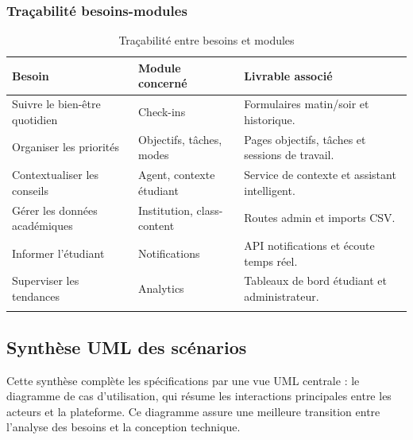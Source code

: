 \documentclass{rapportENSET}
\begin{document}
\subsubsection*{Traçabilité besoins-modules}
\begin{longtable}{@{}L{0.30\textwidth}L{0.30\textwidth}L{0.30\textwidth}@{}}
\toprule
\textbf{Besoin} & \textbf{Module concerné} & \textbf{Livrable associé} \\
\midrule
\endhead
Suivre le bien-être quotidien & Check-ins & Formulaires matin/soir et historique. \\
Organiser les priorités & Objectifs, tâches, modes & Pages objectifs, tâches et sessions de travail. \\
Contextualiser les conseils & Agent, contexte étudiant & Service de contexte et assistant intelligent. \\
Gérer les données académiques & Institution, class-content & Routes admin et imports CSV. \\
Informer l'étudiant & Notifications & API notifications et écoute temps réel. \\
Superviser les tendances & Analytics & Tableaux de bord étudiant et administrateur. \\
\bottomrule
\caption{Traçabilité entre besoins et modules}
\end{longtable}

\subsection{Synthèse UML des scénarios}
Cette synthèse complète les spécifications par une vue UML centrale : le diagramme de cas d'utilisation, qui résume les interactions principales entre les acteurs et la plateforme. Ce diagramme assure une meilleure transition entre l'analyse des besoins et la conception technique.
\end{document}
